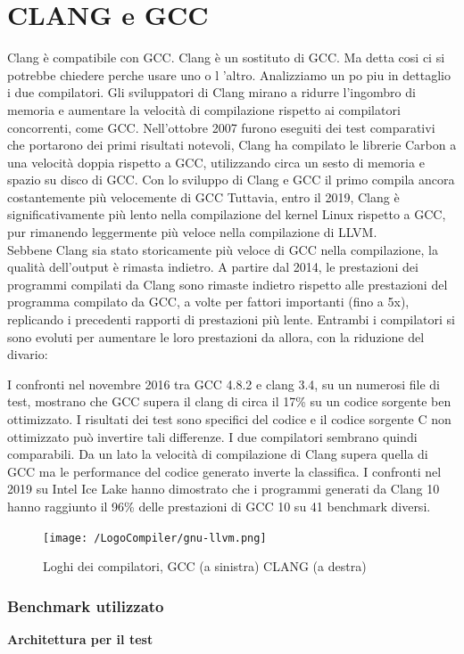 \documentclass[12pt,a4paper]{report}
\begin{document}
\section{CLANG e GCC}
Clang è compatibile con GCC. Clang è un sostituto di GCC. Ma detta cosi ci si potrebbe chiedere perche usare uno o l 'altro. Analizziamo un po piu in dettaglio i due compilatori.
Gli sviluppatori di Clang mirano a ridurre l'ingombro di memoria e aumentare la velocità di compilazione rispetto ai compilatori concorrenti, come GCC. Nell'ottobre 2007 furono eseguiti dei test comparativi che portarono dei primi risultati notevoli, Clang ha compilato le librerie Carbon a una velocità doppia rispetto a GCC, utilizzando circa un sesto di memoria e spazio su disco di GCC. Con lo sviluppo di Clang e GCC il primo compila ancora costantemente più velocemente di GCC Tuttavia, entro il 2019, Clang è significativamente più lento nella compilazione del kernel Linux rispetto a GCC, pur rimanendo leggermente più veloce nella compilazione di LLVM.\\
Sebbene Clang sia stato storicamente più veloce di GCC nella compilazione, la qualità dell'output è rimasta indietro. A partire dal 2014, le prestazioni dei programmi compilati da Clang sono rimaste indietro rispetto alle prestazioni del programma compilato da GCC, a volte per fattori importanti (fino a 5x), replicando i precedenti rapporti di prestazioni più lente. Entrambi i compilatori si sono evoluti per aumentare le loro prestazioni da allora, con la riduzione del divario:

I confronti nel novembre 2016 tra GCC 4.8.2 e clang 3.4, su un numerosi file di test, mostrano che GCC supera il clang di circa il 17\% su un codice sorgente ben ottimizzato. I risultati dei test sono specifici del codice e il codice sorgente C non ottimizzato può invertire tali differenze. I due compilatori sembrano quindi  comparabili. Da un lato la velocità di compilazione di Clang supera quella di GCC ma le performance del codice generato inverte la classifica.
I confronti nel 2019 su Intel Ice Lake hanno dimostrato che i programmi generati da Clang 10 hanno raggiunto il 96\% delle prestazioni di GCC 10 su 41 benchmark diversi.
\cite{GCCvsCLANG}


\begin{figure}[h]
\centering
	\texttt{[image: /LogoCompiler/gnu-llvm.png]}
	\caption{Loghi dei compilatori, GCC (a sinistra) CLANG (a destra)}
	\label{Fig:LoghiCompilatori}
\end{figure}


\subsubsection{Benchmark utilizzato}
\textbf{Architettura per il test}\\
\end{document}
